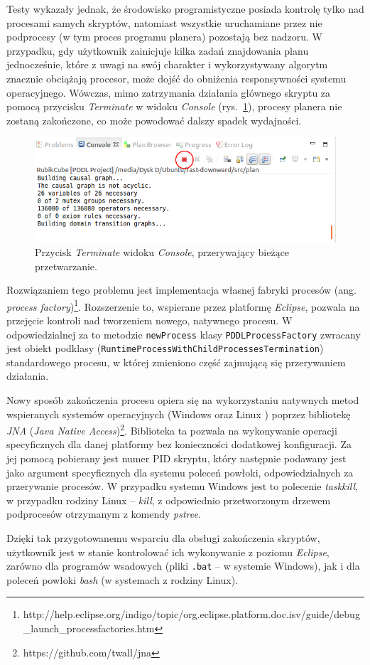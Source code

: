 Testy wykazały jednak, że środowisko programistyczne posiada kontrolę tylko nad procesami samych skryptów, natomiast wszystkie uruchamiane przez nie podprocesy (w tym proces programu planera) pozostają bez nadzoru. W przypadku, gdy użytkownik zainicjuje kilka zadań znajdowania planu jednocześnie, które z uwagi na swój charakter i wykorzystywany algorytm znacznie obciążają procesor, może dojść do obniżenia responsywności systemu operacyjnego. Wówczas, mimo zatrzymania działania głównego skryptu za pomocą przycisku \textit{Terminate} w widoku \textit{Console} (rys.~\ref{fig:terminate_button}), procesy planera nie zostaną zakończone, co może powodować dalszy spadek wydajności.

\begin{figure}[h!]
    \centering
    \includegraphics[width=\textwidth]{img/terminate_button}
    \caption{Przycisk \textit{Terminate} widoku \textit{Console}, przerywający bieżące przetwarzanie.}
    \label{fig:terminate_button}
\end{figure}

Rozwiązaniem tego problemu jest implementacja własnej fabryki procesów (ang. \textit{process factory})\footnote{http://help.eclipse.org/indigo/topic/org.eclipse.platform.doc.isv/guide/debug\_launch\_processfactories.htm}. Rozszerzenie to, wspierane przez platformę \emph{Eclipse}, pozwala na przejęcie kontroli nad tworzeniem nowego, natywnego procesu. W odpowiedzialnej za to metodzie \texttt{newProcess} klasy \texttt{PDDLProcessFactory} zwracany jest obiekt podklasy (\texttt{RuntimeProcessWithChildProcessesTermination}) standardowego procesu, w której zmieniono część zajmującą się przerywaniem działania.

Nowy sposób zakończenia procesu opiera się na wykorzystaniu natywnych metod wspieranych systemów operacyjnych (Windows oraz Linux ) poprzez bibliotekę \textit{JNA} (\textit{Java Native Access})\footnote{https://github.com/twall/jna}. Biblioteka ta pozwala na wykonywanie operacji specyficznych dla danej platformy bez konieczności dodatkowej konfiguracji. Za jej pomocą pobierany jest numer PID skryptu, który następnie podawany jest jako argument specyficznych dla systemu poleceń powłoki, odpowiedzialnych za przerywanie procesów. W przypadku systemu Windows jest to polecenie \emph{taskkill}, w przypadku rodziny Linux -- \emph{kill}, z odpowiednio przetworzonym drzewem podprocesów otrzymanym z komendy \emph{pstree}.

Dzięki tak przygotowanemu wsparciu dla obsługi zakończenia skryptów, użytkownik jest w stanie kontrolować ich wykonywanie z poziomu \emph{Eclipse}, zarówno dla programów wsadowych (pliki \texttt{.bat} -- w systemie Windows), jak i dla poleceń powłoki \textit{bash} (w systemach z rodziny Linux).
